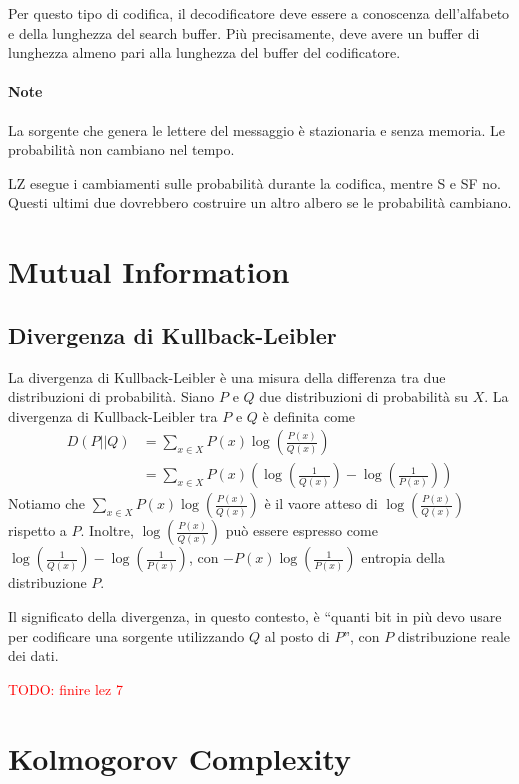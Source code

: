 Per questo tipo di codifica, il decodificatore deve essere a conoscenza dell'alfabeto e della lunghezza del search buffer. Più precisamente, deve avere un buffer di lunghezza almeno pari alla lunghezza del buffer del codificatore.

\paragraph{Note} La sorgente che genera le lettere del messaggio è stazionaria e senza memoria. Le probabilità non cambiano nel tempo. 

LZ esegue i cambiamenti sulle probabilità durante la codifica, mentre S e SF no. Questi ultimi due dovrebbero costruire un altro albero se le probabilità cambiano.




\section{Mutual Information}

\subsection{Divergenza di Kullback-Leibler}
La divergenza di Kullback-Leibler è una misura della differenza tra due distribuzioni di probabilità. Siano $P$ e $Q$ due distribuzioni di probabilità su $X$. La divergenza di Kullback-Leibler tra $P$ e $Q$ è definita come
\begin{align*}
    D(P||Q) &= \sum_{x\in X} P(x)\log\left(\frac{P(x)}{Q(x)}\right)\\
    &= \sum_{x\in X} P(x) \left( \log\left(\frac{1}{Q(x)}\right) - \log\left(\frac{1}{P(x)}\right) \right)
\end{align*}
Notiamo che $\sum_{x\in X} P(x)\log\left(\frac{P(x)}{Q(x)}\right)$ è il vaore atteso di $\log\left(\frac{P(x)}{Q(x)}\right)$ rispetto a $P$. Inoltre, $\log\left(\frac{P(x)}{Q(x)}\right)$ può essere espresso come $\log\left(\frac{1}{Q(x)}\right) - \log\left(\frac{1}{P(x)}\right)$, con $-P(x)\log\left(\frac{1}{P(x)}\right)$ entropia della distribuzione $P$.

Il significato della divergenza, in questo contesto, è ``quanti bit in più devo usare per codificare una sorgente utilizzando $Q$ al posto di $P$'', con $P$ distribuzione reale dei dati.

\textcolor{Red}{TODO: finire lez 7}




\section{Kolmogorov Complexity}